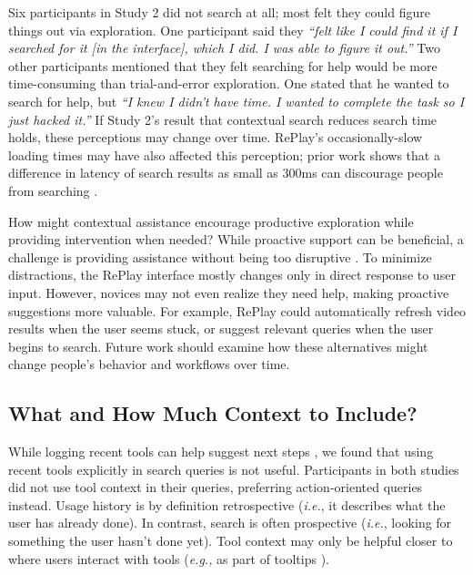 Six participants in Study 2 did not search at all; most felt they could figure things out via exploration. One participant said they \textit{``felt like I could find it if I searched for it [in the interface], which I did. I was able to figure it out.''} Two other participants mentioned that they felt searching for help would be more time-consuming than trial-and-error exploration. One stated that he wanted to search for help, but \textit{``I knew I didn't have time. I wanted to complete the task so I just hacked it.''} If Study 2's result that contextual search reduces search time holds, these perceptions may change over time. RePlay's occasionally-slow loading times may have also affected this perception; prior work shows that a difference in latency of search results as small as 300ms can discourage people from searching \cite{Brutlag2009}.

How might contextual assistance encourage productive exploration while providing intervention when needed? While proactive support can be beneficial, a challenge is providing assistance without being too disruptive \cite{Matejka2011}. To minimize distractions, the RePlay interface mostly changes only in direct response to user input. However, novices may not even realize they need help, making proactive suggestions more valuable. For example, RePlay could automatically refresh video results when the user seems stuck, or suggest relevant queries when the user begins to search. Future work should examine how these alternatives might change people's behavior and workflows over time.

\subsection{What and How Much Context to Include?}
While logging recent tools can help suggest next steps \cite{Matejka2009}, we found that using recent tools explicitly in search queries is not useful. Participants in both studies did not use tool context in their queries, preferring action-oriented queries instead. Usage history is by definition retrospective (\textit{i.e.}, it describes what the user has already done). In contrast, search is often prospective (\textit{i.e.}, looking for something the user hasn't done yet). Tool context may only be helpful closer to where users interact with tools (\textit{e.g.,} as part of tooltips \cite{Grossman2010a}).

